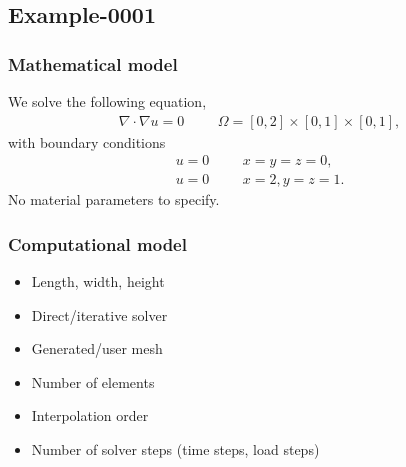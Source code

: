 %
\clearpage
%
\subsection{Example-0001}
%
%
\subsubsection{Mathematical model}
%
We solve the following equation,
%
\begin{align}
    \nabla \cdot \nabla u = 0 & &&\Omega = [0, 2] \times [0, 1] \times [0, 1],
\end{align}
%
with boundary conditions
%
\begin{align}
    u = 0 & &&x = y = z = 0, \\
    u = 0 & &&x = 2, y = z = 1.
\end{align}
%
No material parameters to specify.
%
%
\subsubsection{Computational model}
%
\begin{itemize}
    \item{Length, width, height}
    \item{Direct/iterative solver}
    \item{Generated/user mesh}
    \item{Number of elements}
    \item{Interpolation order}
    \item{Number of solver steps (time steps, load steps)}
\end{itemize}
%
%

